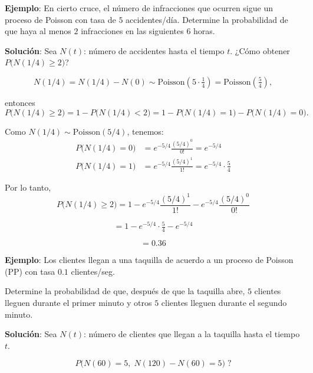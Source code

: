 \documentclass[12pt,a4paper]{article}
\begin{document}
\textbf{Ejemplo}: En cierto cruce, el número de infracciones que ocurren sigue un proceso de Poisson con tasa de $5$ accidentes/día.  
Determine la probabilidad de que haya al menos $2$ infracciones en las siguientes $6$ horas.

\textbf{Solución}: Sea $N(t)$: número de accidentes hasta el tiempo $t$. ¿Cómo obtener $P\big(N(1/4) \geq 2\big)$?

\begin{equation*}
N(1/4) = N(1/4) - N(0) \sim \text{Poisson}\!\left( 5 \cdot \tfrac{1}{4} \right) 
= \text{Poisson}\!\left(\tfrac{5}{4}\right),
\end{equation*}

entonces
\begin{equation*}
P\big(N(1/4) \geq 2\big) 
= 1 - P\big(N(1/4) < 2\big)
= 1 - P\big(N(1/4) = 1\big) - P\big(N(1/4) = 0\big).
\end{equation*}

Como $N(1/4) \sim \text{Poisson}(5/4)$, tenemos:
\begin{align*}
P\big(N(1/4) = 0\big) &= e^{-5/4} \frac{(5/4)^0}{0!} = e^{-5/4} \\
P\big(N(1/4) = 1\big) &= e^{-5/4} \frac{(5/4)^1}{1!} = e^{-5/4} \cdot \tfrac{5}{4}
\end{align*}

Por lo tanto,
\begin{equation*}
P\big(N(1/4) \geq 2\big) 
= 1 - e^{-5/4}\frac{(5/4)^1}{1!} - e^{-5/4}\frac{(5/4)^0}{0!}
\end{equation*}

\begin{equation*}
= 1 - e^{-5/4}\cdot \tfrac{5}{4} - e^{-5/4}
\end{equation*}

\begin{equation*}
= 0.36
\end{equation*}

\textbf{Ejemplo}: Los clientes llegan a una taquilla de acuerdo a un proceso de Poisson (PP) con tasa $0.1$ clientes/seg.  

Determine la probabilidad de que, después de que la taquilla abre, $5$ clientes lleguen durante el primer minuto y otros $5$ clientes lleguen durante el segundo minuto.

\textbf{Solución}: Sea $N(t)$: número de clientes que llegan a la taquilla hasta el tiempo $t$.

\begin{equation*}
P\big(N(60) = 5,\; N(120) - N(60) = 5\big)\; ?
\end{equation*}
\end{document}
